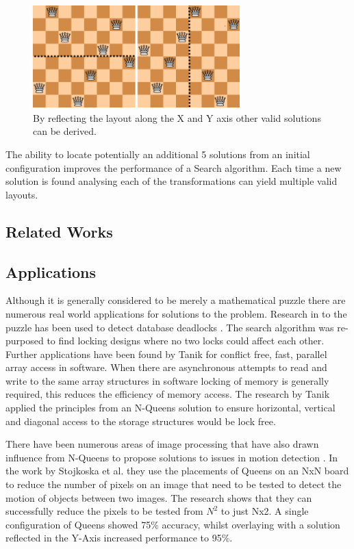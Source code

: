 \documentclass[conference]{IEEEtran}
\begin{document}
\begin{figure}[!htbp]
	\centering	
	\includegraphics[width=8cm, height=4cm]{Valid8QueensReflected}
	\caption{By reflecting the layout along the X and Y axis other valid solutions can be derived.}
\end{figure}

The ability to locate potentially an additional 5 solutions from an initial configuration improves the performance of a Search algorithm. Each time a new solution is found analysing each of the transformations can yield multiple valid layouts.

\subsection{Related Works}


\subsection{Applications}

Although it is generally considered to be merely a mathematical puzzle there are numerous real world applications for solutions to the problem. Research in to the puzzle has been used to detect database deadlocks \cite{Deadlock}. The search algorithm was re-purposed to find locking designs where no two locks could affect each other. Further applications have been found by Tanik \cite{SIMD} \cite{Circulant} for conflict free, fast, parallel array access in software. When there are asynchronous attempts to read and write to the same array structures in software locking of memory is generally required, this reduces the efficiency of memory access. The research by Tanik applied the principles from an N-Queens solution to ensure horizontal, vertical and diagonal access to the storage structures would be lock free.

There have been numerous areas of image processing that have also drawn influence from N-Queens to propose solutions to issues in motion detection \cite{WSN}. In the work by Stojkoska et al. they use the placements of Queens on an NxN board to reduce the number of pixels on an image that need to be tested to detect the motion of objects between two images. The research shows that they can successfully reduce the pixels to be tested from $N^2$ to just Nx2. A single configuration of Queens showed 75\% accuracy, whilst overlaying with a solution reflected in the Y-Axis increased performance to 95\%.
\end{document}
